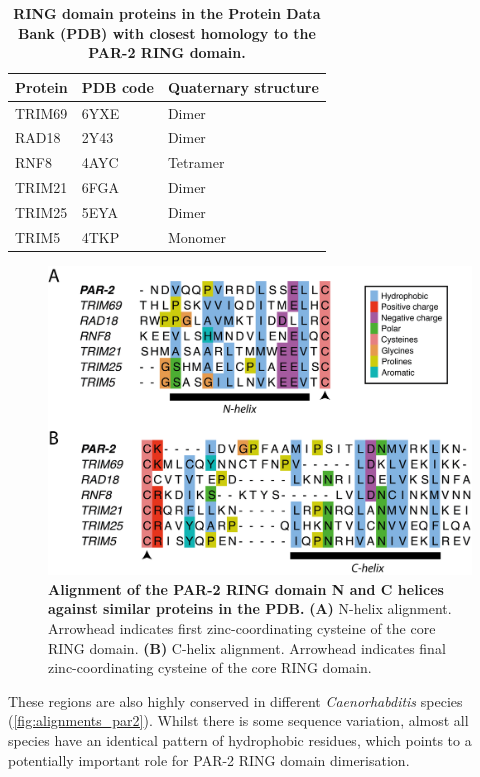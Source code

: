 \documentclass[12pt]{"report"}
\newcommand{\mycaption}[2]{\caption[#1]{\textbf{#1.} #2}}
\begin{document}
\begin{table}[]
\centering
\begin{tabular}{|l|l|l|}
\hline
\textbf{Protein} & \textbf{PDB code} & \textbf{Quaternary structure} \\ \hline
TRIM69 & 6YXE & Dimer \\ \hline
RAD18 & 2Y43 & Dimer \\ \hline
RNF8 & 4AYC & Tetramer \\ \hline
TRIM21 & 6FGA & Dimer \\ \hline
TRIM25 & 5EYA & Dimer \\ \hline
TRIM5 & 4TKP & Monomer \\ \hline
\end{tabular}
\mycaption{RING domain proteins in the Protein Data Bank (PDB) with closest homology to the PAR-2 RING domain}{}
\label{tab:rings_pdb}
\end{table}

\begin{figure}
\includegraphics[scale=1]{alignments_other_rings}
\centering
\mycaption{Alignment of the PAR-2 RING domain N and C helices against similar proteins in the PDB}{
\textbf{(A)} N-helix alignment. Arrowhead indicates first zinc-coordinating cysteine of the core RING domain.
\textbf{(B)} C-helix alignment. Arrowhead indicates final zinc-coordinating cysteine of the core RING domain.
}
\label{fig:alignments_other_rings}
\end{figure}

These regions are also highly conserved in different \textit{Caenorhabditis} species (\cref{fig:alignments_par2}). Whilst there is some sequence variation, almost all species have an identical pattern of hydrophobic residues, which points to a potentially important role for PAR-2 RING domain dimerisation. \\
\end{document}
